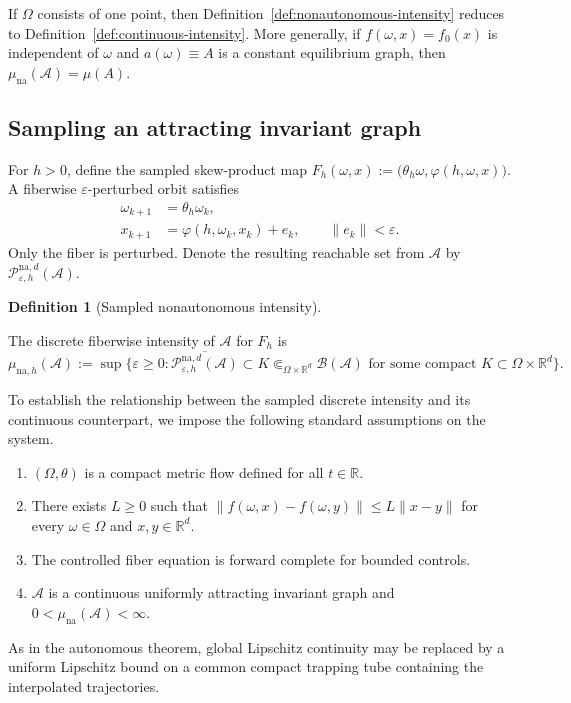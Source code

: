 \documentclass[pdflatex,sn-mathphys-num]{sn-jnl}
\numberwithin{equation}{section}
\theoremstyle{thmstyleone}%
\theoremstyle{definition}
\newtheorem{definition}[theorem]{Definition}
\theoremstyle{remark}
\begin{document}
If $\Omega$ consists of one point, then Definition~\ref{def:nonautonomous-intensity} reduces to Definition~\ref{def:continuous-intensity}. More generally, if $f(\omega,x)=f_0(x)$ is independent of $\omega$ and $a(\omega)\equiv A$ is a constant equilibrium graph, then $\mu_{\mathrm{na}}(\mathcal A)=\mu(A)$.

\subsection{Sampling an attracting invariant graph}
\label{subsec:nonautonomous-sampling}

For $h>0$, define the sampled skew-product map $F_h(\omega,x) := \bigl(\theta_h\omega, \varphi(h,\omega,x) \bigr)$. A fiberwise $\varepsilon$-perturbed orbit satisfies
\begin{equation*}
\begin{aligned}
    \omega_{k+1}
    &=
    \theta_h\omega_k,\\
    x_{k+1}
    &=
    \varphi(h,\omega_k,x_k)+e_k,
    \qquad
    \|e_k\|<\varepsilon.
\end{aligned}
\end{equation*}
Only the fiber is perturbed. Denote the resulting reachable set from $\mathcal A$ by $\mathcal P_{\varepsilon,h}^{\mathrm{na},d}(\mathcal A)$.

\begin{definition}[Sampled nonautonomous intensity]
\label{def:sampled-na-intensity}

The discrete fiberwise intensity of $\mathcal A$ for $F_h$ is
\[
    \mu_{\mathrm{na},h}(\mathcal A)
    :=
    \sup\bigl\{
    \varepsilon\geq0:
    \overline{
        \mathcal P_{\varepsilon,h}^{\mathrm{na},d}
        (\mathcal A)
    }
    \subset K
    \Subset_{\Omega\times\mathbb R^d}
    \mathcal B(\mathcal A)
    \text{ for some compact }
    K\subset\Omega\times\mathbb R^d
    \bigr\}.
\]
\end{definition}

To establish the relationship between the sampled discrete intensity and its continuous counterpart, we impose the following standard assumptions on the system.
\begin{enumerate}
\renewcommand{\theenumi}{(NA\arabic{enumi})}
\renewcommand{\labelenumi}{\textnormal{\theenumi}}
\item
\label{hyp:na-compact-base}
$(\Omega,\theta)$ is a compact metric flow defined for all $t\in\mathbb R$.
\item
\label{hyp:na-uniform-lipschitz}
There exists $L\geq0$ such that $\|f(\omega,x)-f(\omega,y)\| \leq L\|x-y\|$ for every $\omega\in\Omega$ and $x,y\in\mathbb R^d$.
\item
\label{hyp:na-forward-complete}
The controlled fiber equation is forward complete for bounded controls.
\item
\label{hyp:na-attracting-graph}
$\mathcal A$ is a continuous uniformly attracting invariant graph and
$0<\mu_{\mathrm{na}}(\mathcal A)<\infty$.
\end{enumerate}
As in the autonomous theorem, global Lipschitz continuity may be replaced by a uniform Lipschitz bound on a common compact trapping tube containing the interpolated trajectories.
\end{document}

